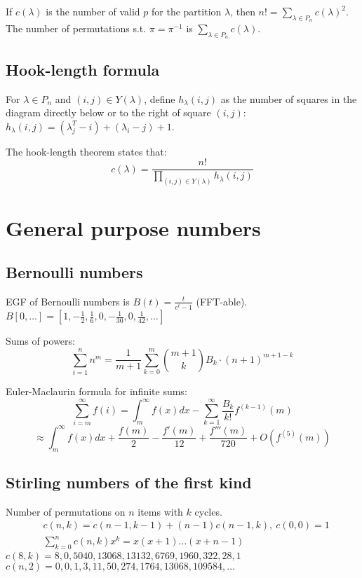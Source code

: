 		If $c(\lambda)$ is the number of valid $p$ for the partition $\lambda$, then $n! = \sum_{\lambda \in P_n} c(\lambda)^2$. \\
		The number of permutations s.t. $\pi = \pi^{-1}$ is $\sum_{\lambda \in P_n} c(\lambda)$.

	\subsection{Hook-length formula}
		For $\lambda \in P_n$ and $(i, j) \in Y(\lambda)$, define $h_{\lambda}(i, j)$ as the number of squares in the diagram directly below or to the right of square $(i, j)$: $h_{\lambda}(i, j) = (\lambda^T_j - i) + (\lambda_i - j) + 1$.
		
		The hook-length theorem states that:
		\small
		\[ c(\lambda) = \frac{n!}{\prod_{(i, j) \in Y(\lambda)} h_\lambda(i, j)} \]
		\normalsize

\section{General purpose numbers}
	\subsection{Bernoulli numbers}
		EGF of Bernoulli numbers is $B(t)=\frac{t}{e^t-1}$ (FFT-able).
		$B[0,\ldots] = [1, -\frac{1}{2}, \frac{1}{6}, 0, -\frac{1}{30}, 0, \frac{1}{42}, \ldots]$

		Sums of powers:
		\small
		\[ \sum_{i=1}^n n^m = \frac{1}{m+1} \sum_{k=0}^m \binom{m+1}{k} B_k \cdot (n+1)^{m+1-k} \]
		\normalsize

		Euler-Maclaurin formula for infinite sums:
		\small
		\[ \sum_{i=m}^{\infty} f(i) = \int_m^\infty f(x) dx - \sum_{k=1}^\infty \frac{B_k}{k!}f^{(k-1)}(m) \]
		\[ \approx \int_{m}^\infty f(x)dx + \frac{f(m)}{2} - \frac{f'(m)}{12} + \frac{f'''(m)}{720} + O(f^{(5)}(m)) \]
		\normalsize

	\subsection{Stirling numbers of the first kind}
		Number of permutations on $n$ items with $k$ cycles.
		\begin{align*}
			&c(n,k) = c(n-1,k-1) + (n-1) c(n-1,k),\ c(0,0) = 1 \\
			&\textstyle \sum_{k=0}^n c(n,k)x^k = x(x+1) \dots (x+n-1)
		\end{align*}
		$c(8,k) = 8, 0, 5040, 13068, 13132, 6769, 1960, 322, 28, 1$ \\
		$c(n,2) = 0, 0, 1, 3, 11, 50, 274, 1764, 13068, 109584, \dots$

